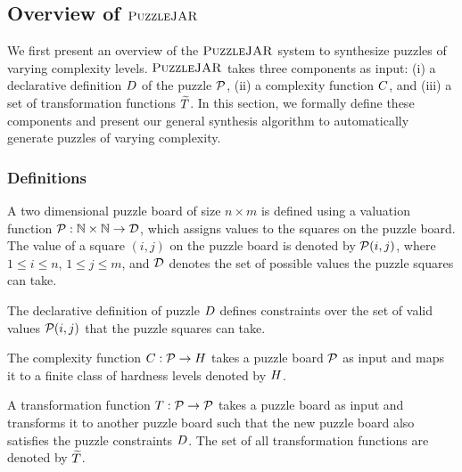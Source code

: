 \subsection{Overview of $\textsc{PuzzleJAR}$}

We first present an overview of the $\textsc{PuzzleJAR}$ system to synthesize
puzzles of varying complexity levels. $\textsc{PuzzleJAR}$ takes three
components as input: (i) a declarative definition $D$ of the
puzzle $\mathcal{P}$, (ii) a complexity function $C$,
and (iii) a set of transformation functions $\widetilde{T}$. In
this section, we formally define these components and present our
general synthesis algorithm to automatically generate puzzles of
varying complexity.

\subsubsection{Definitions}

\begin{definition}[Puzzle]
A two dimensional puzzle board of size $n \times m$ is defined using a
valuation function $\mathcal{P}: \mathbb{N} \times \mathbb{N}
\rightarrow \mathcal{D}$, which assigns values to the squares on the
puzzle board. The value of a square $(i,j)$ on the puzzle board is denoted by
$\mathcal{P}(i,j)$, where $1 \leq i \leq n$, $1 \leq j \leq m$, and
$\mathcal{D}$ denotes the set of possible values the puzzle
squares can take.
\end{definition}

\begin{definition}
The declarative definition of puzzle $D$ defines constraints over the set of valid values $\mathcal{P}(i,j)$ that the puzzle squares can take.
\end{definition}

\begin{definition}[Complexity]
The complexity function $C : \mathcal{P} \rightarrow
H$ takes a puzzle board $\mathcal{P}$ as input and maps
it to a finite class of hardness levels denoted by $H$.
\end{definition}

\begin{definition}[Transformations]
A transformation function $T : \mathcal{P} \rightarrow
\mathcal{P}$ takes a puzzle board as input and transforms it to
another puzzle board such that the new puzzle board also satisfies the
puzzle constraints $D$. The set of all transformation
functions are denoted by $\widetilde{T}$.
\end{definition}

